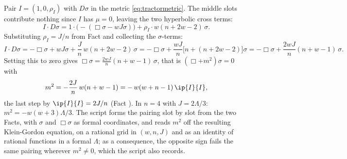 Pair $I = (1, 0, \rho_{I})$ with $D\sigma$ in the metric \eqref{eq:tractormetric}. The middle slots contribute nothing since $I$ has $\mu = 0$, leaving the two hyperbolic cross terms:
\[
I \cdot D\sigma = 1 \cdot \bigl(-(\Box\sigma - wJ\sigma)\bigr) + \rho_{I} \cdot w(n+2w-2)\,\sigma .
\]
Substituting $\rho_{I} = J/n$ from Fact  and collecting the $\sigma$-terms:
\[
I \cdot D\sigma = -\Box\sigma + wJ\sigma + \frac{J}{n}\,w(n+2w-2)\,\sigma
= -\Box\sigma + \frac{wJ}{n}\bigl[n + (n+2w-2)\bigr]\sigma
= -\Box\sigma + \frac{2wJ}{n}(n+w-1)\,\sigma .
\]
Setting this to zero gives $\Box\sigma = \tfrac{2wJ}{n}(n+w-1)\,\sigma$, that is $(\Box + m^{2})\sigma = 0$ with
\[
m^{2} = -\frac{2J}{n}\,w(n+w-1) = -\,w(w+n-1)\,\ip{I}{I},
\]
the last step by $\ip{I}{I} = 2J/n$ (Fact ). In $n = 4$ with $J = 2\Lambda/3$: $m^{2} = -w(w+3)\Lambda/3$. The script forms the pairing slot by slot from the two Facts, with $\sigma$ and $\Box\sigma$ as formal coordinates, and reads $m^{2}$ off the resulting Klein-Gordon equation, on a rational grid in $(w, n, J)$ and as an identity of rational functions in a formal $\Lambda$; as a consequence, the opposite sign fails the same pairing wherever $m^{2} \neq 0$, which the script also records.
